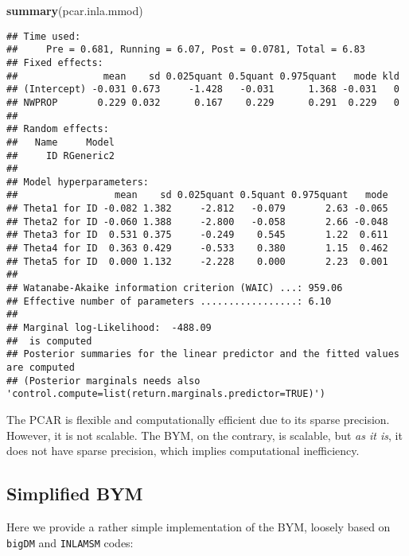\documentclass[
]{article}
\newenvironment{Shaded}{\begin{snugshade}}{\end{snugshade}}
\newcommand{\FunctionTok}[1]{\textcolor[rgb]{0.13,0.29,0.53}{\textbf{#1}}}
\newcommand{\NormalTok}[1]{#1}
\begin{document}
\begin{Shaded}
\begin{Highlighting}[]
\FunctionTok{summary}\NormalTok{(pcar.inla.mmod)}
\end{Highlighting}
\end{Shaded}

\begin{verbatim}
## Time used:
##     Pre = 0.681, Running = 6.07, Post = 0.0781, Total = 6.83 
## Fixed effects:
##               mean    sd 0.025quant 0.5quant 0.975quant   mode kld
## (Intercept) -0.031 0.673     -1.428   -0.031      1.368 -0.031   0
## NWPROP       0.229 0.032      0.167    0.229      0.291  0.229   0
## 
## Random effects:
##   Name     Model
##     ID RGeneric2
## 
## Model hyperparameters:
##                 mean    sd 0.025quant 0.5quant 0.975quant   mode
## Theta1 for ID -0.082 1.382     -2.812   -0.079       2.63 -0.065
## Theta2 for ID -0.060 1.388     -2.800   -0.058       2.66 -0.048
## Theta3 for ID  0.531 0.375     -0.249    0.545       1.22  0.611
## Theta4 for ID  0.363 0.429     -0.533    0.380       1.15  0.462
## Theta5 for ID  0.000 1.132     -2.228    0.000       2.23  0.001
## 
## Watanabe-Akaike information criterion (WAIC) ...: 959.06
## Effective number of parameters .................: 6.10
## 
## Marginal log-Likelihood:  -488.09 
##  is computed 
## Posterior summaries for the linear predictor and the fitted values are computed
## (Posterior marginals needs also 'control.compute=list(return.marginals.predictor=TRUE)')
\end{verbatim}

The PCAR is flexible and computationally efficient due to its sparse
precision. However, it is not scalable. The BYM, on the contrary, is
scalable, but \textit{as it is}, it does not have sparse precision,
which implies computational inefficiency.

\subsection{Simplified BYM}\label{simplified-bym}

Here we provide a rather simple implementation of the BYM, loosely based
on \texttt{bigDM} and \texttt{INLAMSM} codes:
\end{document}
